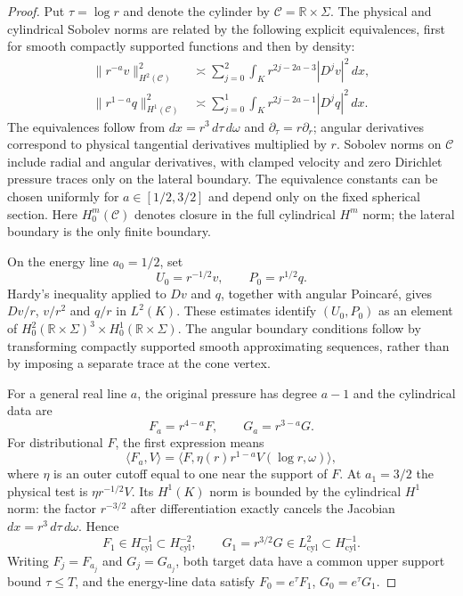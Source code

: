 \documentclass[11pt,a4paper]{article}
\theoremstyle{remark}
\numberwithin{equation}{section}
\begin{document}
\begin{proof}
Put $\tau=\log r$ and denote the cylinder by
$\mathcal C=\mathbb R\times\Sigma$. The physical and cylindrical
Sobolev norms are related by the following explicit equivalences, first
for smooth compactly supported functions and then by density:
\begin{align}
 \|r^{-a}v\|_{H^2(\mathcal C)}^2
 &\asymp\sum_{j=0}^{2}\int_K
       r^{2j-2a-3}|D^jv|^2\,dx,\label{eq:g-cylindrical-velocity}\\
 \|r^{1-a}q\|_{H^1(\mathcal C)}^2
 &\asymp\sum_{j=0}^{1}\int_K
       r^{2j-2a-1}|D^jq|^2\,dx.\label{eq:g-cylindrical-pressure}
\end{align}
The equivalences follow from $dx=r^3\,d\tau\,d\omega$ and
$\partial_\tau=r\partial_r$; angular derivatives correspond to
physical tangential derivatives multiplied by $r$. Sobolev norms on
$\mathcal C$ include radial and angular derivatives, with clamped
velocity and zero Dirichlet pressure traces only on the lateral boundary.
The equivalence constants can be chosen uniformly for
$a\in[1/2,3/2]$ and depend only on the fixed spherical section.
Here $H^m_0(\mathcal C)$ denotes closure in the full cylindrical
$H^m$ norm; the lateral boundary is the only finite boundary.

On the energy line $a_0=1/2$, set
\[
 U_0=r^{-1/2}v,\qquad P_0=r^{1/2}q.
\]
Hardy's inequality applied to $Dv$ and $q$, together with angular Poincar\'e,
gives $Dv/r$, $v/r^2$ and $q/r$ in $L^2(K)$. These estimates identify
$(U_0,P_0)$ as an element of
$H^2_0(\mathbb R\times\Sigma)^3\times H^1_0(\mathbb R\times\Sigma)$.
The angular boundary conditions follow by transforming compactly supported
smooth approximating sequences, rather than by imposing a separate trace at
the cone vertex.

For a general real line $a$, the original pressure has degree $a-1$ and the
cylindrical data are
\begin{equation}\label{eq:g-mellin-data-conversion}
 F_a=r^{4-a}F,\qquad G_a=r^{3-a}G.
\end{equation}
For distributional $F$, the first expression means
\[
 \langle F_a,V\rangle
 =\langle F,\eta(r)r^{1-a}V(\log r,\omega)\rangle,
\]
where $\eta$ is an outer cutoff equal to one near the support of $F$. At $a_1=3/2$
the physical test is $\eta r^{-1/2}V$. Its $H^1(K)$ norm is bounded by the
cylindrical $H^1$ norm: the factor $r^{-3/2}$ after differentiation exactly
cancels the Jacobian $dx=r^3\,d\tau\,d\omega$. Hence
\[
 F_1\in H^{-1}_{\mathrm{cyl}}\subset H^{-2}_{\mathrm{cyl}},
 \qquad G_1=r^{3/2}G\in L^2_{\mathrm{cyl}}\subset H^{-1}_{\mathrm{cyl}}.
\]
Writing $F_j=F_{a_j}$ and $G_j=G_{a_j}$, both target data have a
common upper support bound $\tau\le T$, and the energy-line data satisfy
$F_0=e^\tau F_1$, $G_0=e^\tau G_1$.


\end{proof}
\end{document}

